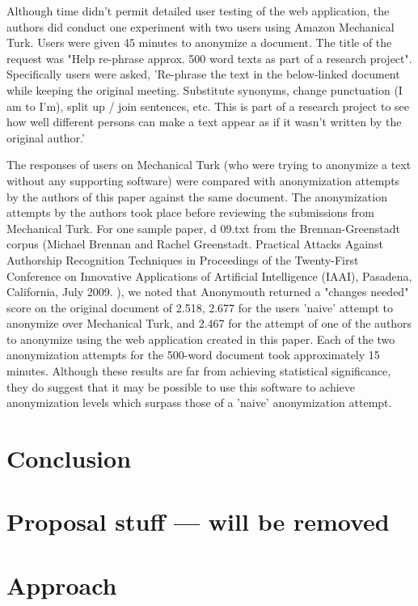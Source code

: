 \documentclass[letterpaper]{article}
\begin{document}
Although time didn't permit detailed user testing of the web
application, the authors did conduct one experiment with two users
using Amazon Mechanical Turk. Users were given 45 minutes to anonymize
a document. The title of the request was "Help re-phrase approx. 500
word texts as part of a research project". Specifically users were
asked, 'Re-phrase the text in the below-linked document while keeping
the original meeting. Substitute synonyms, change punctuation (I am to
I'm), split up / join sentences, etc. This is part of a research
project to see how well different persons can make a text appear as if
it wasn't written by the original author.'

The responses of users on Mechanical Turk (who were trying to
anonymize a text without any supporting software) were compared with
anonymization attempts by the authors of this paper against the same
document. The anonymization attempts by the authors took place before
reviewing the submissions from Mechanical Turk. For one sample paper,
d 09.txt from the Brennan-Greenstadt corpus (Michael Brennan and Rachel Greenstadt. Practical Attacks Against Authorship Recognition Techniques in Proceedings of the Twenty-First Conference on Innovative Applications of Artificial Intelligence (IAAI), Pasadena, California, July 2009.
), we noted that Anonymouth returned a "changes needed" score
on the original document of 2.518, 2.677 for the users 'naive' attempt
to anonymize over Mechanical Turk, and 2.467 for the attempt of one of
the authors to anonymize using the web application created in this
paper. Each of the two anonymization attempts for the 500-word
document took approximately 15 minutes. Although these results are far from achieving statistical
significance, they do suggest that it may be possible to use this
software to achieve anonymization levels which surpass those of a
'naive' anonymization attempt.



\section{Conclusion}


\section{Proposal stuff --- will be removed}


\section*{Approach}\label{sec:approach}
\end{document}
